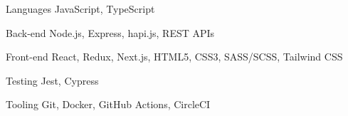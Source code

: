 
\begin{cvskills}

  \cvskill
    {Languages} %
    {JavaScript, TypeScript} %

  \cvskill
    {Back-end} %
    {Node.js, Express, hapi.js, REST APIs} %

  \cvskill
    {Front-end} %
    {React, Redux, Next.js, HTML5, CSS3, SASS/SCSS, Tailwind CSS} %

  \cvskill
    {Testing} %
    {Jest, Cypress} %

  \cvskill
    {Tooling} %
    {Git, Docker, GitHub Actions, CircleCI} %

\end{cvskills}
